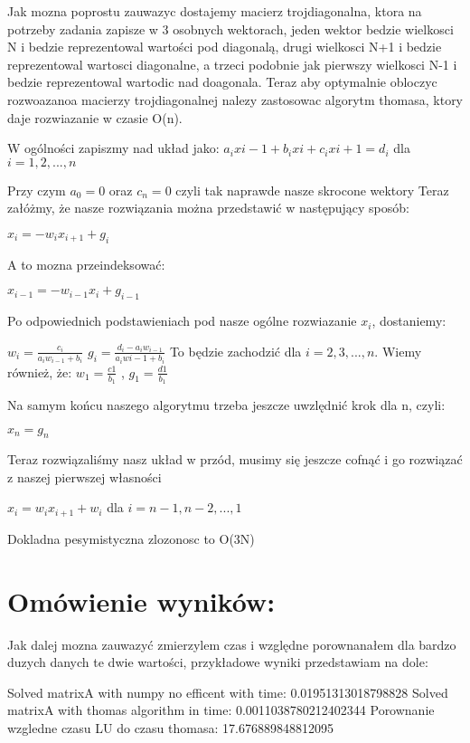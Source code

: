 \documentclass[12pt]{article}
\begin{document}
Jak mozna poprostu zauwazyc dostajemy macierz trojdiagonalna, ktora na potrzeby zadania zapisze w 3 osobnych wektorach, jeden wektor bedzie wielkosci N i bedzie reprezentowal wartości pod diagonalą, drugi wielkosci N+1 i bedzie reprezentowal wartosci diagonalne, a trzeci podobnie jak pierwszy wielkosci N-1 i bedzie reprezentowal wartodic nad doagonala. Teraz aby optymalnie obloczyc rozwoazanoa macierzy trojdiagonalnej nalezy zastosowac algorytm thomasa, ktory daje rozwiazanie w czasie O(n).
\begin{center}
W ogólności zapiszmy nad układ jako:
$a_{i}x{i-1} + b_{i}x{i} + c_{i}x{i+1} = d_{i}$ dla $i = 1,2,...,n$
\end{center}
Przy czym $a_{0} = 0$ oraz $c_{n} = 0$ czyli tak naprawde nasze skrocone wektory
Teraz załóżmy, że nasze rozwiązania można przedstawić w następujący sposób:
\begin{center}
$x_{i} = -w_{i}x_{i+1} + g_{i}$
\end{center}
A to mozna przeindeksować:
\begin{center}
$x_{i-1} = -w_{i-1}x_{i} + g_{i-1}$
\end{center}
Po odpowiednich podstawieniach pod nasze ogólne rozwiazanie $x_{i}$, dostaniemy:
\begin{center}
$w_{i} = \frac{c_{i}}{a_{i}w_{i-1}+b_{i}}$\newline\newline
$g_{i} = \frac{d_{i}-a_{i}w_{i-1}}{a_{i}w{i-1}+b_{i}}$\newline\newline
To będzie zachodzić dla $i=2,3,...,n$.
Wiemy również, że:\newline\newline
$w_{1} = \frac{c{1}}{b_{1}}$ ,
$g_{1} = \frac{d{1}}{b_{1}}$
\end{center}
Na samym końcu naszego algorytmu trzeba jeszcze uwzlędnić krok dla n, czyli:
\begin{center}
$x_{n} = g_{n}$
\end{center}
Teraz rozwiązaliśmy nasz układ w przód, musimy się jeszcze cofnąć i go rozwiązać z naszej pierwszej własności 
\begin{center}
$x_{i} = w_{i}x_{i+1}+w_{i}$ dla $i = n-1, n-2,...,1$
\end{center}


Dokladna pesymistyczna zlozonosc to O(3N)
\section{Omówienie wyników:}
 
Jak dalej mozna zauwazyć zmierzylem czas i względne porownanałem dla bardzo duzych danych te dwie wartości, przykładowe wyniki przedstawiam na dole:
\begin{center}
Solved matrixA with numpy no efficent with time: 0.01951313018798828
\newline
\newline
Solved matrixA with thomas algorithm in time: 0.0011038780212402344
\newline
\newline
Porownanie wzgledne czasu LU do czasu thomasa:
17.676889848812095
\end{center}
\end{document}
